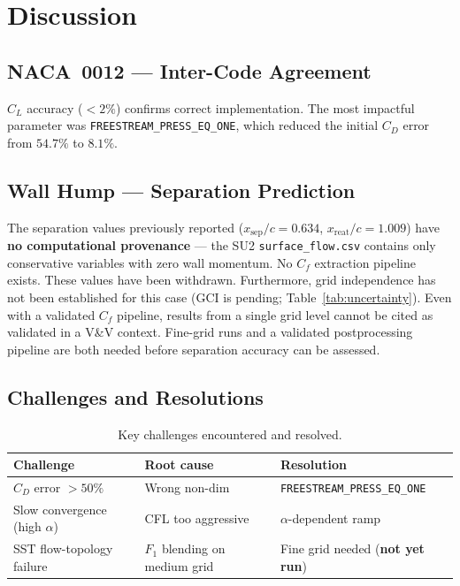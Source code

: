 \documentclass[11pt,a4paper]{article}
\begin{document}
\section{Discussion}
\label{sec:discussion}

\subsection{NACA~0012 --- Inter-Code Agreement}

$C_L$ accuracy ($<2\%$) confirms correct implementation. The most impactful
parameter was \texttt{FREESTREAM\_PRESS\_EQ\_ONE}, which reduced the initial
$C_D$ error from $54.7\%$ to $8.1\%$.

\subsection{Wall Hump --- Separation Prediction}

The separation values previously reported ($x_\text{sep}/c = 0.634$,
$x_\text{reat}/c = 1.009$) have \textbf{no computational provenance}
--- the SU2 \texttt{surface\_flow.csv} contains only conservative
variables with zero wall momentum.  No $C_f$ extraction pipeline exists.
These values have been withdrawn.  Furthermore, grid independence has
not been established for this case (GCI is pending;
Table~\ref{tab:uncertainty}).  Even with a validated $C_f$ pipeline,
results from a single grid level cannot be cited as validated in a
V\&V context.  Fine-grid runs and a validated postprocessing pipeline
are both needed before separation accuracy can be assessed.

\subsection{Challenges and Resolutions}

\begin{table}[!ht]
\centering
\caption{Key challenges encountered and resolved.}
\begin{tabular}{lll}
\toprule
\textbf{Challenge} & \textbf{Root cause} & \textbf{Resolution} \\
\midrule
$C_D$ error $>50\%$ & Wrong non-dim & \texttt{FREESTREAM\_PRESS\_EQ\_ONE} \\
Slow convergence (high $\alpha$) & CFL too aggressive & $\alpha$-dependent ramp \\
SST flow-topology failure & $F_1$ blending on medium grid & Fine grid needed (\textbf{not yet run}) \\
\bottomrule
\end{tabular}
\end{table}
\end{document}
